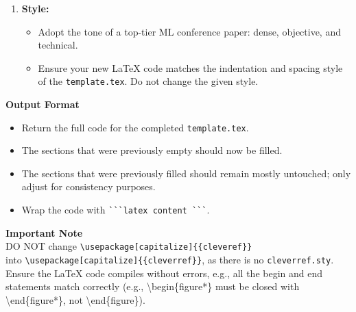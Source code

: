 \begin{enumerate}
\begin{itemize}
    \end{itemize}
    \item \textbf{Style:}
    \begin{itemize}
        \item Adopt the tone of a top-tier ML conference paper: dense, objective, and technical.
        \item Ensure your new LaTeX code matches the indentation and spacing style of the \texttt{template.tex}. Do not change the given style.
    \end{itemize}
\end{enumerate}

\vspace{1em}
\noindent\textbf{Output Format}
\begin{itemize}
    \item Return the full code for the completed \texttt{template.tex}.
    \item The sections that were previously empty should now be filled.
    \item The sections that were previously filled should remain mostly untouched; only adjust for consistency purposes.
    \item Wrap the code with \verb|```latex content ```|.
\end{itemize}

\vspace{1em}
\noindent\textbf{Important Note}\\
\vspace{0.5em}
DO NOT change \texttt{\textbackslash{}usepackage[capitalize]\{\{cleveref\}\}} \\
into \texttt{\textbackslash{}usepackage[capitalize]\{\{cleverref\}\}}, as there is no \texttt{cleverref.sty}.\\
Ensure the LaTeX code compiles without errors, e.g., all the begin and end statements match correctly (e.g., \textbackslash{}begin\{figure*\} must be closed with \textbackslash{}end\{figure*\}, not \textbackslash{}end\{figure\}).
